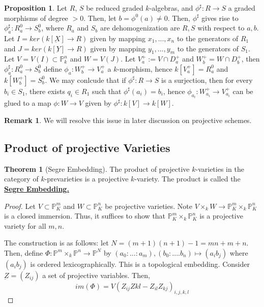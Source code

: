 \documentclass{article}
\theoremstyle{definition}
\newtheorem{theorem}{Theorem}[section]
\theoremstyle{definition}
\theoremstyle{definition}
\newtheorem{remark}{Remark}[theorem]
\theoremstyle{definition}
\newtheorem{proposition}{Proposition}[theorem]
\theoremstyle{definition}
\theoremstyle{definition}
\theoremstyle{definition}
\begin{document}
\begin{tcolorbox}[colback=blue!5!white,colframe=blue!30!white]
\begin{proposition}
Let $R$, $S$ be reduced graded $k$-algebras, and $\phi^{\sharp}: R\to S$ a graded morphisms of degree $>0$. Then, let $b=\phi^0(a)\neq 0$. Then, $\phi^{\sharp}$ gives rise to $\phi^{\sharp}_a: R_a^0\to S_b^0$, where $R_a$ and $S_b$ are dehomogenization are $R,S$ with respect to $a,b$. Let $I=ker(k[\underbar{X}]\to R)$ given by mapping $x_1,...,x_n$ to the generators of $R_1$ and  $J=ker(k[\underbar{Y}]\to R)$ given by mapping $y_1,...,y_m$ to the generators of $S_1$. Let $V=V(I)\subset \mathbb{P}^n_k$ and $W=V(J)$. Let $V_a^+:= V\cap D_a^+$ and $W_b^+=W\cap D_b^+$, then $\phi_a^{\sharp}: R_a^0\to S_b^0$ define $\phi_a: W^+_b\to V^+_a$ a $k$-morphism, hence $k[V^+_a]=R_a^0$ and $k[W^+_b]=S_b^0$. We may conlcude that if $\phi^{\sharp}: R\to S$ is a surjection, then for every $b_i\in S_1$, there exists $q_i\in R_1$ such that $\phi^{\sharp}(a_i)=b_i$, hence $\phi_{a_i}: W^+_{a_i}\to V^+_{a_i}$ can be glued to a map $\phi: W\to V$ given by $\phi^{\sharp}: k[V]\to k[W]$. 
\end{proposition}
\end{tcolorbox}


\begin{tcolorbox}[colback=green!5!white,colframe=green!30!white]
\begin{remark}
We will resolve this issue in later discussion on projective schemes. 
\end{remark}
\end{tcolorbox}
    

\subsection{Product of projective Varieties}

\begin{tcolorbox}[colback=red!5!white,colframe=red!30!white]
\begin{theorem}[Segre Embedding]
The product of projective $k$-varieties in the category of $k$-prevarieties is a projective $k$-variety. The product is called the \underline{\textbf{Segre Embedding.}}
\end{theorem}
\end{tcolorbox}
\begin{proof}
    Let $V\subset \mathbb{P}^m_K$ and $W\subset \mathbb{P}^n_K$ be projective varieties. Note $V\times_k W\to \mathbb{P}^m_K\times_k \mathbb{P}^n_K$ is a closed immersion. Thus, it suffices to show that $\mathbb{P}^m_K\times_k \mathbb{P}^n_K$ is a projective variety for all $m,n$. 

    The construction is as follows: let $N=(m+1)(n+1)-1=mn+m+n$. Then, define $\Phi: \mathbb{P}^m\times_k \mathbb{P}^n\to \mathbb{P}^N$ by $(a_0:...:a_m),(b_0:....b_n)\mapsto (a_ib_j)$ where $(a_ib_j)$ is ordered lexicographically. This is a topological embedding. Consider $\underbar{Z}=(Z_{ij})$ a set of projective variables. Then, $$im(\Phi)=V(Z_{ij}Z{kl}-Z_{il}Z_{kj})_{i,j,k,l}$$
\end{proof}
\end{document}
